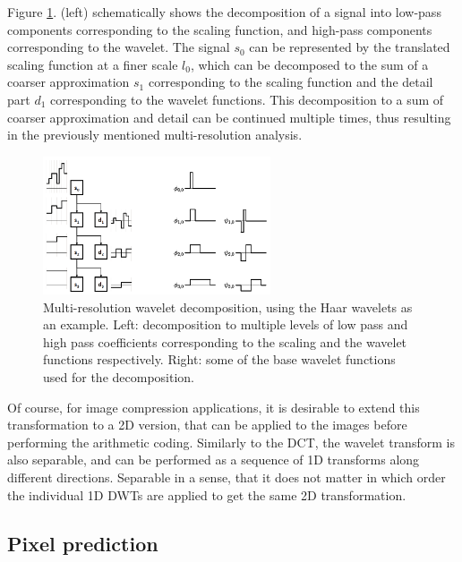 \documentclass{diploma_style}
\begin{document}
Figure \ref{fig:wavelet}. (left) schematically shows the decomposition of a signal into low-pass components corresponding to the scaling function, and high-pass components corresponding to the wavelet. The signal $s_0$ can be represented by the translated scaling function at a finer scale $l_0$, which can be decomposed to the sum of a coarser approximation $s_1$ corresponding to the scaling function and the detail part $d_1$ corresponding to the wavelet functions. This decomposition to a sum of coarser approximation and detail can be continued multiple times, thus resulting in the previously mentioned multi-resolution analysis.


\begin{figure}
\centering
\includegraphics[width=0.6\textwidth]{figures/3_compression/wavelet}
\caption{Multi-resolution wavelet decomposition, using the Haar wavelets as an example. Left: decomposition to multiple levels of low pass and high pass coefficients corresponding to the scaling and the wavelet functions respectively. Right: some of the base wavelet functions used for the decomposition.}
\label{fig:wavelet}
\end{figure}


Of course, for image compression applications, it is desirable to extend this transformation to a 2D version, that can be applied to the images before performing the arithmetic coding. Similarly to the DCT, the wavelet transform is also separable, and can be performed as a sequence of 1D transforms along different directions. Separable in a sense, that it does not matter in which order the individual 1D DWTs are applied to get the same 2D transformation.

\subsection{Pixel prediction}
\end{document}
